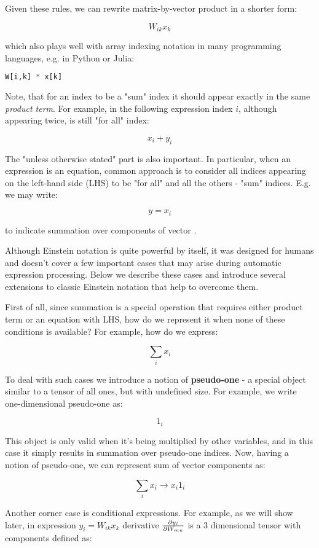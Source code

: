 \documentclass[conference]{IEEEtran}
\begin{document}
Given these rules, we can rewrite matrix-by-vector product in a
shorter form:


$$W_{ik}x_k$$

which also plays well with array indexing notation in many programming
languages, e.g. in Python or Julia:

\begin{lstlisting}[language=Python]
  W[i,k] * x[k]
\end{lstlisting}

Note, that for an index to be a "sum" index it should appear exactly
in the same \textit{product term}. For example, in the following
expression index $i$, although appearing twice, is still "for all"
index:

$$x_i + y_i$$

The "unless otherwise stated" part is also important. In particular,
when an expression is an equation, common approach is to consider all
indices appearing on the left-hand side (LHS) to be "for all" and all
the others - "sum" indices. E.g. we may write:

$$y = x_i$$

to indicate summation over components of vector .

Although Einstein notation is quite powerful by itself, it was
designed for humans and doesn't cover a few important cases that may
arise during automatic expression processing. Below we describe these
cases and introduce several extensions to classic Einstein notation
that help to overcome them.

First of all, since summation is a special operation that requires
either product term or an equation with LHS, how do we represent it
when none of these conditions is available? For example, how do we
express:

$$\sum_ix_i$$

To deal with such cases we introduce a notion of \textbf{pseudo-one} -
a special object similar to a tensor of all ones, but with undefined
size. For example, we write one-dimensional pseudo-one as:

$$1_i$$

This object is only valid when it's being multiplied by other
variables, and in this case it simply results in summation over
pseudo-one indices. Now, having a notion of pseudo-one, we can
represent sum of vector components as:

$$\sum_ix_i \rightarrow x_i1_i$$

Another corner case is conditional expressions. For example, as we
will show later, in expression $y_i = W_{ik}x_k$ derivative
$\pdv{y_i}{W_{mn}}$ is a 3 dimensional tensor with components defined
as:
\end{document}
